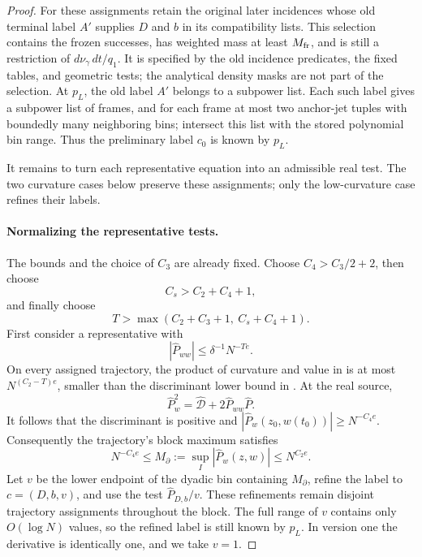 \begin{proof}
For these assignments retain the original later incidences whose
old terminal label \(A'\) supplies \(D\) and \(b\) in its
compatibility lists.  This selection contains the frozen
successes, has weighted mass at least \(M_{\rm fr}\), and is still
a restriction of \(d\nu_\gamma\,dt/q_1\).  It is specified by the
old incidence predicates, the fixed tables, and geometric tests;
the analytical density masks are not part of the selection.
At \(p_L\), the old label \(A'\) belongs to a subpower list.
Each such label gives a subpower list of frames, and for each frame
at most two anchor-jet tuples with boundedly many neighboring bins;
intersect this list with the stored polynomial bin range.
Thus the preliminary label \(c_0\) is known by \(p_L\).

It remains to turn each representative equation into an admissible
real test.  The two curvature cases below preserve these
assignments; only the low-curvature case refines their labels.

\paragraph{Normalizing the representative tests.}
The bounds  and the choice of
\(C_3\) are already fixed.  Choose \(C_4>C_3/2+2\), then choose
\[
 C_s>C_2+C_4+1,
\]
and finally choose
\begin{equation}
 T>\max(C_2+C_3+1,\ C_s+C_4+1).
 \label{a02:late-constant-order}
\end{equation}
First consider a representative with
\[
 |\widehat P_{ww}|\le\delta^{-1}N^{-Te}.
\]
On every assigned trajectory, the product of curvature and value
in  is at most
\(N^{(C_2-T)e}\), smaller than the discriminant lower bound in
.  At the real source,
\[
 \widehat P_w^2
 =\widehat{\mathcal D}+2\widehat P_{ww}\widehat P.
\]
It follows that the discriminant is positive and
\(|\widehat P_w(z_0,w(t_0))|\ge N^{-C_4e}\).
Consequently the trajectory's block maximum satisfies
\[
 N^{-C_4e}\le M_\partial:=\sup_I|\widehat P_w(z,w)|
 \le N^{C_2e}.
\]
Let \(v\) be the lower endpoint of the dyadic bin containing
\(M_\partial\), refine the label to \(c=(D,b,v)\), and use the test
\(\widehat P_{D,b}/v\).  These refinements remain disjoint
trajectory assignments throughout the block.  The full range of
\(v\) contains only \(O(\log N)\) values, so the refined label
is still known by \(p_L\).  In version one the derivative is
identically one, and we take \(v=1\).


\end{proof}
